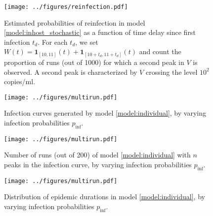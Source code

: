 \documentclass[11pt]{article}
\numberwithin{equation}{subsection}
\begin{document}
    \begin{figure}[h!]
    \begin{center}
        \texttt{[image: ../figures/reinfection.pdf]}
    \end{center}
    \caption{
        Estimated probabilities of reinfection in model
        \ref{model:inhost_stochastic} as a function of time delay since first
        infection $t_d$.  For each $t_d$, we set $W(t) = \mathbf{1}_{[10,
        11]}(t) + \mathbf{1}_{[10 + t_d, 11 + t_d]}(t)$ and count the
        proportion of runs (out of 1000) for which a second peak in $V$ is
        observed. A second peak is characterized by $V$ crossing the level
        $10^2$ copies/ml.
    }
    \label{fig:reinfection}
    \end{figure}

    \begin{figure}[h!]
    \begin{center}
        \texttt{[image: ../figures/multirun.pdf]}
    \end{center}
    \caption{
        Infection curves generated by model \ref{model:individual}, by varying
        infection probabilities $p_\text{inf}$.
    }
    \label{fig:multiruns}
    \end{figure}


    \begin{figure}[h!]
    \begin{center}
        \texttt{[image: ../figures/multirun.pdf]}
    \end{center}
    \caption{
        Number of runs (out of 200) of model \ref{model:individual} with $n$
        peaks in the infection curve, by varying infection probabilities
        $p_\text{inf}$.
    }
    \label{fig:peaks}
    \end{figure}

    \begin{figure}[h!]
    \begin{center}
        \texttt{[image: ../figures/multirun.pdf]}
    \end{center}
    \caption{
        Distribution of epidemic durations in model \ref{model:individual}, by
        varying infection probabilities $p_\text{inf}$.
    }
    \label{fig:durations}
    \end{figure}
\end{document}
